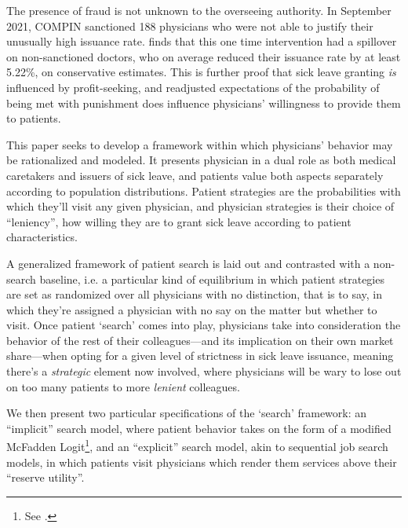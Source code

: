 \documentclass[../main.tex]{subfiles}
\begin{document}
The presence of fraud is not unknown to the overseeing authority. In September 2021, COMPIN sanctioned 188 physicians who were not able to justify their unusually high issuance rate. \cite{oteiza} finds that this one time intervention had a spillover on non-sanctioned doctors, who on average reduced their issuance rate by at least 5.22\%, on conservative estimates. This is further proof that sick leave granting \textit{is} influenced by profit-seeking, and readjusted expectations of the probability of being met with punishment does influence physicians' willingness to provide them to patients.

This paper seeks to develop a framework within which physicians' behavior may be rationalized and modeled. It presents physician in a dual role as both medical caretakers and issuers of sick leave, and patients value both aspects separately according to population distributions. Patient strategies are the probabilities with which they'll visit any given physician, and physician strategies is their choice of ``leniency'', how willing they are to grant sick leave according to patient characteristics.

A generalized framework of patient search is laid out and contrasted with a non-search baseline, i.e. a particular kind of equilibrium in which patient strategies are set as randomized over all physicians with no distinction, that is to say, in which they're assigned a physician with no say on the matter but whether to visit. Once patient `search' comes into play, physicians take into consideration the behavior of the rest of their colleagues—and its implication on their own market share—when opting for a given level of strictness in sick leave issuance, meaning there's a \textit{strategic} element now involved, where physicians will be wary to lose out on too many patients to more \textit{lenient} colleagues.

We then present two particular specifications of the `search' framework: an ``implicit'' search model, where patient behavior takes on the form of a modified McFadden Logit\footnote{See \cite{mcfadden}.}, and an ``explicit'' search model, akin to sequential job search models, in which patients visit physicians which render them services above their ``reserve utility''.
\end{document}
